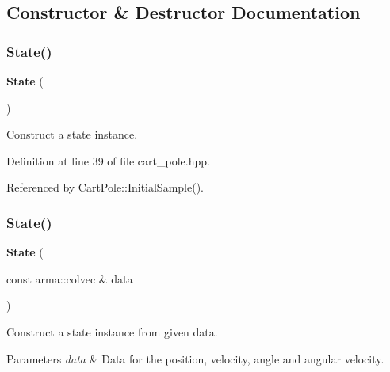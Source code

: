 \subsection{Constructor \& Destructor Documentation}
\mbox{\label{classmlpack_1_1rl_1_1CartPole_1_1State_a790355057d12e9c1ce7643551c16fecd}} 
\subsubsection{State()\hspace{0.1cm}{\footnotesize\ttfamily [1/2]}}
{\footnotesize\ttfamily \textbf{ State} (\begin{DoxyParamCaption}{ }\end{DoxyParamCaption})\hspace{0.3cm}{\ttfamily [inline]}}



Construct a state instance. 



Definition at line 39 of file cart\+\_\+pole.\+hpp.



Referenced by Cart\+Pole\+::\+Initial\+Sample().

\mbox{\label{classmlpack_1_1rl_1_1CartPole_1_1State_a8bc7967f6d91a3c94f9b3f502297a926}} 
\subsubsection{State()\hspace{0.1cm}{\footnotesize\ttfamily [2/2]}}
{\footnotesize\ttfamily \textbf{ State} (\begin{DoxyParamCaption}\item[{const arma\+::colvec \&}]{data }\end{DoxyParamCaption})\hspace{0.3cm}{\ttfamily [inline]}}



Construct a state instance from given data. 


\begin{DoxyParams}{Parameters}
{\em data} & Data for the position, velocity, angle and angular velocity. \\
\hline
\end{DoxyParams}


